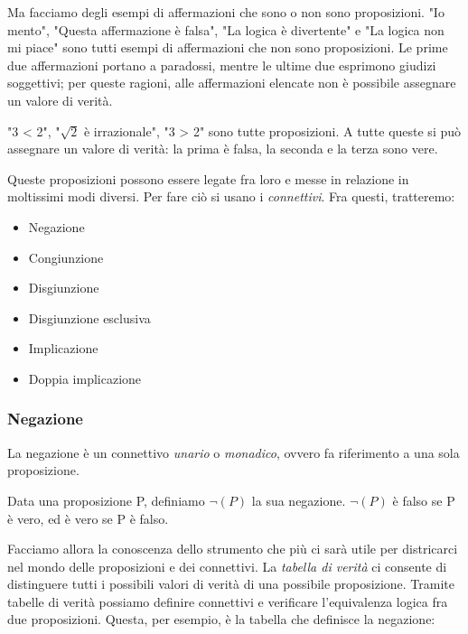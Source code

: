 \documentclass{article}
\begin{document}
Ma facciamo degli esempi di affermazioni che sono o non sono proposizioni.
"Io mento", "Questa affermazione è falsa", "La logica è divertente" e "La logica non mi piace"
sono tutti esempi di affermazioni che non sono proposizioni. Le prime due affermazioni
portano a paradossi, mentre le ultime due esprimono giudizi soggettivi; per queste
ragioni, alle affermazioni elencate non è possibile assegnare un valore di verità.

"3 < 2", "$\sqrt{2}$ è irrazionale", "3 > 2" sono tutte proposizioni. A tutte queste
si può assegnare un valore di verità: la prima è falsa, la seconda e la terza sono vere.

Queste proposizioni possono essere legate fra loro e messe in relazione in moltissimi modi 
diversi. Per fare ciò si usano i \textit{connettivi}. Fra questi, tratteremo:
\begin{itemize}[itemsep=0.05mm]
  \item Negazione
  \item Congiunzione
  \item Disgiunzione
  \item Disgiunzione esclusiva
  \item Implicazione
  \item Doppia implicazione
\end{itemize} 

\subsubsection{Negazione}
La negazione è un connettivo \textit{unario} o \textit{monadico}, ovvero fa riferimento
a una sola proposizione.

Data una proposizione P, definiamo $\neg(P)$ la sua negazione. 
$\neg(P)$ è falso se P è vero, ed è vero se P è falso.

Facciamo allora la conoscenza dello strumento che più ci sarà utile per districarci
nel mondo delle proposizioni e dei connettivi. La \textit{tabella di verità} ci consente di 
distinguere tutti i possibili valori di verità di una possibile proposizione.
Tramite tabelle di verità possiamo definire connettivi e verificare l'equivalenza
logica fra due proposizioni. Questa, per esempio, è la tabella che definisce la negazione:
\end{document}
